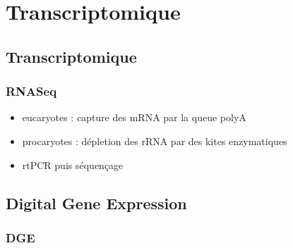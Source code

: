 \documentclass{beamer}
\begin{document}

\section{Transcriptomique} %
\label{sec:rnaseq_dge}
\subsection{Transcriptomique} %
\label{sub:transcriptomique}


\begin{frame}
	\frametitle{RNASeq}
\begin{itemize}
	\item eucaryotes : capture des mRNA par la queue polyA
	\item procaryotes : dépletion des rRNA par des kites enzymatiques
	\item rtPCR puis séquençage
\end{itemize}
\end{frame}

\subsection{Digital Gene Expression} %
\label{sub:digital_gene_expression}

\begin{frame}
	\frametitle{DGE}
\end{frame}
\end{document}
